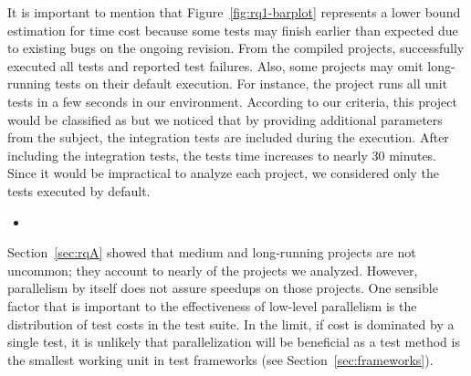 It is important to mention that Figure~\ref{fig:rq1-barplot}
represents a lower bound estimation for time cost because some tests
may finish earlier than expected due to existing bugs on the ongoing
revision.  From the \numSubjs{} compiled projects, \numSubjsPass{}
successfully executed all tests and \numSubjsFail{} reported test
failures.  Also, some projects may omit long-running tests on their
default execution. For instance, the project
 runs all unit tests in a few seconds in
our environment.  According to our criteria, this project would be
classified as \shortg{} but we noticed that by providing additional
parameters from the subject, the integration tests are included during
the execution.  After including the integration tests, the tests time
increases to nearly 30 minutes.  Since it would be impractical to
analyze each project, we considered only the tests executed by
default.

\begin{center}
\end{center}


\vspace{1ex}
\begin{itemize}
    \item \textbf{\RQB}
\end{itemize}

Section~\ref{sec:rqA} showed that medium and long-running projects are
not uncommon; they account to nearly \percentMedLongRunning{} of the
\numSubjs{} projects we analyzed.  However, parallelism by itself does
not assure speedups on those projects.  One sensible factor that is
important to the effectiveness of low-level parallelism is the
distribution of test costs in the test suite.  In the limit, if cost
is dominated by a single test, it is unlikely that parallelization
will be beneficial as a test method is the smallest working unit in
test frameworks (see Section~\ref{sec:frameworks}).

